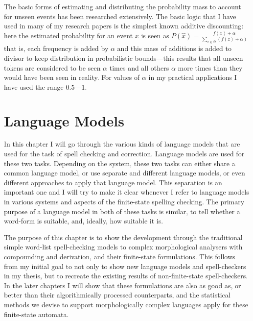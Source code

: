 \documentclass[officiallayout]{unihelcompling}
\begin{document}
The basic forms of estimating and distributing the probability mass to account
for unseen events has been researched extensively. The basic logic that I have
used in many of my research papers is the simplest known additive discounting:
here the estimated probability for an event $x$ is seen as $P(\hat{x}) =
\frac{f(x) + \alpha}{\sum_{z \in \mathcal{D}}(f(z) + \alpha)}$ that is, each
frequency is added by $\alpha$ and this mass of additions is added to divisor
to keep distribution in probabilistic bounds---this results that all unseen
tokens are considered to be seen $\alpha$ times and all others $\alpha$ more
times than they would have been seen in reality. For values of $\alpha$ in
my practical applications I have used the range 0.5---1.



\chapter{Language Models}
\label{chap:language-models}

In this chapter I will go through the various kinds of language models that are
used for the task of spell checking and correction. Language models are used
for these two tasks. Depending on the system, these two tasks can either share
a common language model, or use separate and different language models, or even
different approaches to apply that language model. This separation is an
important one and I will try to make it clear whenever I refer to language
models in various systems and aspects of the finite-state spelling checking.
The primary purpose of a language model in both of these tasks is similar, to
tell whether a word-form is suitable, and, ideally, how suitable it is.

The purpose of this chapter is to show the development through the traditional
simple word-list spell-checking models to complex morphological analysers with
compounding and derivation, and their finite-state formulations. This follows
from my initial goal to not only to show new language models and spell-checkers
in my thesis, but to recreate the existing results of non-finite-state
spell-checkers. In the later chapters I will show that these formulations are
also as good as, or better than their algorithmically processed counterparts,
and the statistical methods we devise to support morphologically complex
languages apply for these finite-state automata.
\end{document}
